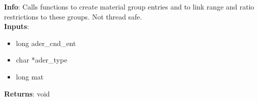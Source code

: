 \textbf{Info}: Calls functions to create material group entries and to link
range and ratio restrictions to these groups. Not thread safe. \\

\noindent \textbf{Inputs}:
\begin{itemize}
\item{long ader\_cnd\_ent}
\item{char *ader\_type}
\item{long mat}
\end{itemize}

\noindent \textbf{Returns}: void
